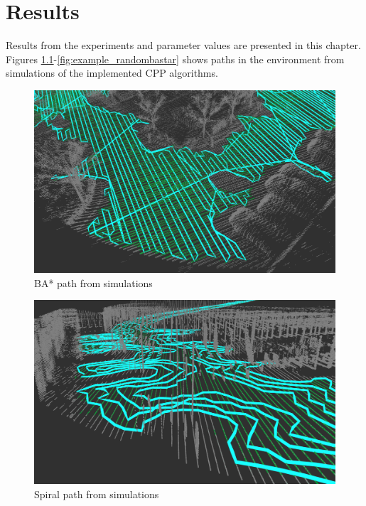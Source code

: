
\chapter{Results}
\label{cha:5-results}
Results from the experiments and parameter values are presented in this chapter. Figures \ref{fig:example_bastar}-\ref{fig:example_randombastar} shows paths in the environment from simulations of the implemented CPP algorithms.

\begin{figure}
    \centering
    \includegraphics[width=\textwidth]{figures/example_bastar2.png}
    \caption{BA* path from simulations}
    \label{fig:example_bastar}
\end{figure}

\begin{figure}
    \centering
    \includegraphics[width=\textwidth]{figures/example_spiral.png}
    \caption{Spiral path from simulations}
    \label{fig:example_spiral}
\end{figure}

